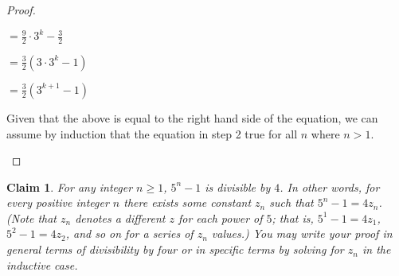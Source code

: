 \documentclass{article}
\newtheorem{claim}{Claim}
\begin{document}
\begin{proof}
\begin{enumerate}
          \hspace{1cm}$= \frac{9}{2} \cdot 3^k - \frac{3}{2}$
          \vspace{.5cm}

          \hspace{1cm}$= \frac{3}{2}(3 \cdot 3^k -1)$
          \vspace{.5cm}

          \hspace{1cm}$=  \frac{3}{2} (3^{k+1}-1)$
          \vspace{.5cm}

        Given that the above is equal to the right hand side of the equation, 
        we can assume by induction that the equation in step 2 true for all 
        $n$ where $n>1$.
        \end{enumerate}

      \end{proof}

    \begin{claim}
      For any integer $n\geq1$, $5^n-1$ is divisible by $4$.  In other 
      words, for every positive integer $n$ there exists some constant 
      $z_n$ such that $5^n - 1 = 4z_n$.  (Note that $z_n$ denotes a 
      different $z$ for each power of $5$; that is, $5^1 - 1 = 4z_1$, 
      $5^2 - 1 = 4z_2$, and so on for a series of $z_n$ values.)  You 
      may write your proof in general terms of divisibility by four or 
      in specific terms by solving for $z_n$ in the inductive case.
      \vspace{.5cm}
    \end{claim}
\end{document}
